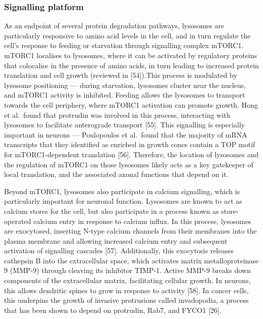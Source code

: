 \documentclass[
  12pt,
  a4paper,
]{book}
\begin{document}
\hypertarget{signalling-platform}{%
\subsubsection{Signalling platform}\label{signalling-platform}}

As an endpoint of several protein degradation pathways, lysosomes are particularly responsive to amino acid levels in the cell, and in turn regulate the cell's response to feeding or starvation through signalling complex mTORC1. mTORC1 localises to lysosomes, where it can be activated by regulatory proteins that colocalise in the presence of amino acids, in turn leading to increased protein translation and cell growth (reviewed in {[}54{]}).This process is modulated by lysosome positioning --- during starvation, lysosomes cluster near the nucleus, and mTORC1 activity is inhibited. Feeding allows the lysosomes to transport towards the cell periphery, where mTORC1 activation can promote growth. Hong et al.~found that protrudin was involved in this process, interacting with lysosomes to facilitate anterograde transport {[}55{]}. This signalling is especially important in neurons --- Poulopoulos et al.~found that the majority of mRNA transcripts that they identified as enriched in growth cones contain a TOP motif for mTORC1-dependent translation {[}56{]}. Therefore, the location of lysosomes and the regulation of mTORC1 on those lysosomes likely acts as a key gatekeeper of local translation, and the associated axonal functions that depend on it.

Beyond mTORC1, lysosomes also participate in calcium signalling, which is particularly important for neuronal function. Lysosomes are known to act as calcium stores for the cell, but also participate in a process known as store-operated calcium entry in response to calcium influx. In this process, lysosomes are exocytosed, inserting N-type calcium channels from their membranes into the plasma membrane and allowing increased calcium entry and subsequent activation of signalling cascades {[}57{]}. Additionally, this exocytosis releases cathepsin B into the extracellular space, which activates matrix metalloproteinase 9 (MMP-9) through cleaving its inhibitor TIMP-1. Active MMP-9 breaks down components of the extracellular matrix, facilitating cellular growth. In neurons, this allows dendritic spines to grow in response to activity {[}58{]}. In cancer cells, this underpins the growth of invasive protrusions called invadopodia, a process that has been shown to depend on protrudin, Rab7, and FYCO1 {[}26{]}.
\end{document}
